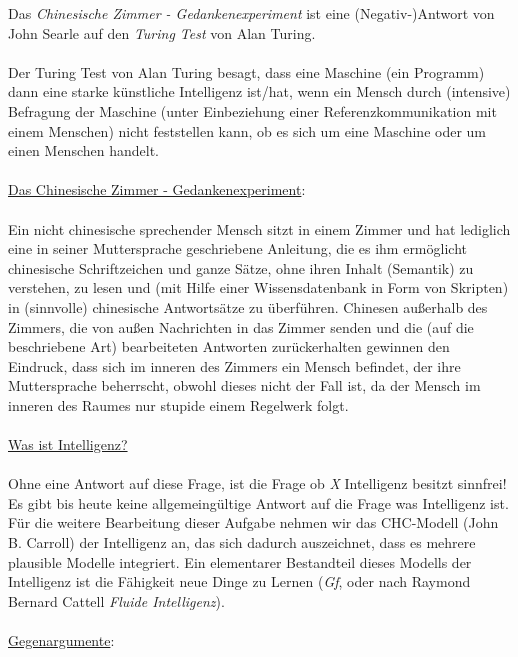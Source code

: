 \documentclass{article}
\begin{document}
Das \textit{Chinesische Zimmer - Gedankenexperiment} ist eine (Negativ-)Antwort von John Searle auf den \textit{Turing Test} von Alan Turing.\\
\\
Der Turing Test von Alan Turing besagt, dass eine Maschine (ein Programm) dann eine starke künstliche Intelligenz ist/hat, wenn ein Mensch durch (intensive) Befragung der Maschine (unter Einbeziehung einer Referenzkommunikation mit einem Menschen) nicht feststellen kann, ob es sich um eine Maschine oder um einen Menschen handelt.\\
\\
\underline{Das Chinesische Zimmer - Gedankenexperiment}:\\
\\
Ein nicht chinesische sprechender Mensch sitzt in einem Zimmer und hat lediglich eine in seiner Muttersprache geschriebene Anleitung, die es ihm ermöglicht chinesische Schriftzeichen und ganze Sätze, ohne ihren Inhalt (Semantik) zu verstehen, zu lesen und (mit Hilfe einer Wissensdatenbank in Form von Skripten) in (sinnvolle) chinesische Antwortsätze zu überführen. Chinesen außerhalb des Zimmers, die von außen Nachrichten in das Zimmer senden und die (auf die beschriebene Art) bearbeiteten Antworten zurückerhalten gewinnen den Eindruck, dass sich im inneren des Zimmers ein Mensch befindet, der ihre Muttersprache beherrscht, obwohl dieses nicht der Fall ist, da der Mensch im inneren des Raumes nur stupide einem Regelwerk folgt.\\
\\
\underline{Was ist Intelligenz?}\\
\\
Ohne eine Antwort auf diese Frage, ist die Frage ob \textit{X} Intelligenz besitzt sinnfrei! Es gibt bis heute keine allgemeingültige Antwort auf die Frage was Intelligenz ist. Für die weitere Bearbeitung dieser Aufgabe nehmen wir das CHC-Modell (John B. Carroll)  der Intelligenz an, das sich dadurch auszeichnet, dass es mehrere plausible Modelle integriert. Ein elementarer Bestandteil dieses Modells der Intelligenz ist die Fähigkeit neue Dinge zu Lernen (\textit{Gf}, oder nach Raymond Bernard Cattell \textit{Fluide Intelligenz}).\\
\\
\underline{Gegenargumente}:\\
\end{document}
